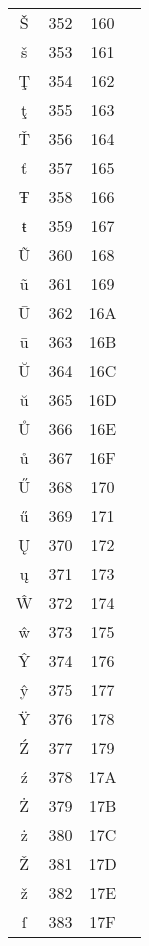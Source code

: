 \documentclass[10pt]{article}
\begin{document}
\begin{tabular}{crcl}
Š&352&160&\\
š&353&161&\\
Ţ&354&162&\\
ţ&355&163&\\
Ť&356&164&\\
ť&357&165&\\
Ŧ&358&166&\\
ŧ&359&167&\\
Ũ&360&168&\\
ũ&361&169&\\
Ū&362&16A&\\
ū&363&16B&\\
Ŭ&364&16C&\\
ŭ&365&16D&\\
Ů&366&16E&\\
ů&367&16F&\\
Ű&368&170&\\
ű&369&171&\\
Ų&370&172&\\
ų&371&173&\\
Ŵ&372&174&\\
ŵ&373&175&\\
Ŷ&374&176&\\
ŷ&375&177&\\
Ÿ&376&178&\\
Ź&377&179&\\
ź&378&17A&\\
Ż&379&17B&\\
ż&380&17C&\\
Ž&381&17D&\\
ž&382&17E&\\
ſ&383&17F&\\
\end{tabular}
\end{document}
